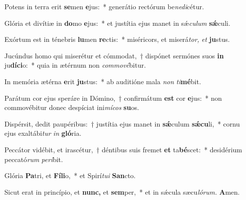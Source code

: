 \item Potens in terra erit \textbf{se}men \textbf{e}jus:~* generátio rectórum be\textit{nedi}\hspace{-0.01em}cétur.
\item Glória et divítiæ in \textbf{do}mo \textbf{e}jus:~* et justítia ejus manet in sǽ\hspace{0.03em}\textit{culum} \textbf{sǽ}culi.
\item Exórtum est in ténebris \textbf{lu}men \textbf{re}ctis:~* miséricors, et miserá\hspace{0.03em}\textit{tor,} \textit{et} \textbf{ju}stus.
\item Jucúndus homo qui miserétur et cómmodat,~† dispónet sermónes suos \textbf{in} ju\textbf{díci}o:~* quia in ætérnum non \textit{commové}bitur.
\item In memória ætérna \textbf{e}rit \textbf{ju}stus:~* ab auditióne mala \textit{non} \textit{ti}\hspace{-0.01em}\textbf{mé}bit.
\item Parátum cor ejus speráre in Dómino,~† confirmátum \textbf{est} cor \textbf{e}jus:~* non commovébitur donec despíciat ini\textit{mícos} \textbf{su}os.
\item Dispérsit, dedit paupéribus:~† justítia ejus manet in \textbf{sǽ}culum \textbf{sǽcu}li,~* cornu ejus exaltábi\textit{tur} \textit{in} \textbf{gló}ria.
\item Peccátor vidébit, et irascétur,~† déntibus suis fremet \textbf{et} ta\textbf{bé}scet:~* desidérium peccató\textit{rum} \textit{perí}bit.
\item Glória \textbf{Pa}tri, et \textbf{Fíli}o,~* et Spirí\hspace{0.03em}\textit{tui} \textbf{San}cto.
\item Sicut erat in princípio, et \textbf{nunc,} et \textbf{sem}per,~* et in sǽcula sæcu\hspace{0.03em}\textit{lórum.} \textbf{A}men.

